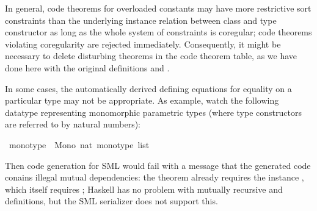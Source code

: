 \begin{isabellebody}
\begin{isamarkuptext}%
%
\end{isamarkuptext}%
\isamarkuptrue%
%
\begin{isamarkuptext}%
In general, code theorems for overloaded constants may have more
  restrictive sort constraints than the underlying instance relation
  between class and type constructor as long as the whole system of
  constraints is coregular; code theorems violating coregularity
  are rejected immediately.  Consequently, it might be necessary
  to delete disturbing theorems in the code theorem table,
  as we have done here with the original definitions 
  and .

  In some cases, the automatically derived defining equations
  for equality on a particular type may not be appropriate.
  As example, watch the following datatype representing
  monomorphic parametric types (where type constructors
  are referred to by natural numbers):%
\end{isamarkuptext}%
\isamarkuptrue%
\isamarkupfalse%
\ monotype\ {\isacharequal}\ Mono\ nat\ {\isachardoublequoteopen}monotype\ list{\isachardoublequoteclose}%
\isadelimproof
%
\endisadelimproof
%
\isatagproof
%
\endisatagproof
{\isafoldproof}%
%
\isadelimproof
%
\endisadelimproof
%
\begin{isamarkuptext}%
Then code generation for SML would fail with a message
  that the generated code conains illegal mutual dependencies:
  the theorem  already requires the
  instance , which itself requires
  ;  Haskell has no problem with mutually
  recursive  and  definitions,
  but the SML serializer does not support this.


\end{isamarkuptext}
\end{isabellebody}
